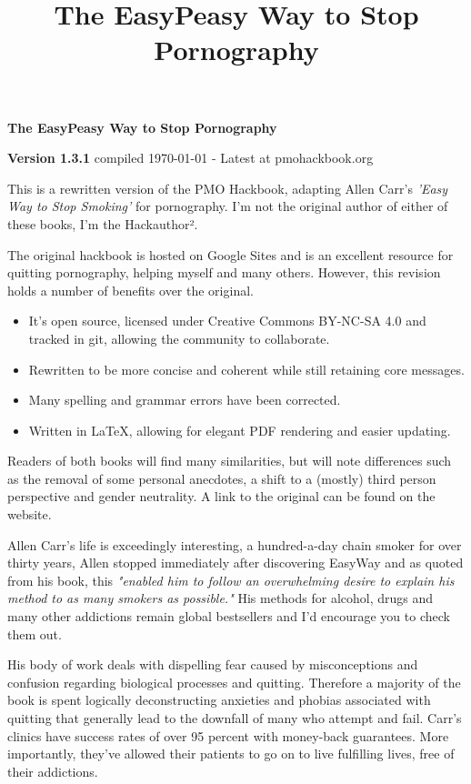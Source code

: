 \documentclass[easypeasy.tex]{subfiles}
\title {The EasyPeasy Way to Stop Pornography}
\begin{document}
\thispagestyle{empty}

\begin{center}
  {\Huge\bfseries The EasyPeasy Way to Stop Pornography \par}
  {\small \textbf{Version 1.3.1} compiled {\today} - Latest at pmohackbook.org}
\end{center}

This is a rewritten version of the PMO Hackbook, adapting Allen Carr's \textit{'Easy Way to Stop Smoking'} for pornography. I'm not the original author of either of these books, I'm the Hackauthor².

The original hackbook is hosted on Google Sites and is an excellent resource for quitting pornography, helping myself and many others. However, this revision holds a number of benefits over the original.
\begin{itemize}
\item It's open source, licensed under Creative Commons BY-NC-SA 4.0 and tracked in git, allowing the community to collaborate.
\item Rewritten to be more concise and coherent while still retaining core messages.
\item Many spelling and grammar errors have been corrected.
\item Written in LaTeX, allowing for elegant PDF rendering and easier updating.
\end{itemize}

Readers of both books will find many similarities, but will note differences such as the removal of some personal anecdotes, a shift to a (mostly) third person perspective and gender neutrality. A link to the original can be found on the website.

Allen Carr's life is exceedingly interesting, a hundred-a-day chain smoker for over thirty years, Allen stopped immediately after discovering EasyWay and as quoted from his book, this \textit{"enabled him to follow an overwhelming desire to explain his method to as many smokers as possible."} His methods for alcohol, drugs and many other addictions remain global bestsellers and I'd encourage you to check them out.

His body of work deals with dispelling fear caused by misconceptions and confusion regarding biological processes and quitting. Therefore a majority of the book is spent logically deconstructing anxieties and phobias associated with quitting that generally lead to the downfall of many who attempt and fail. Carr's clinics have success rates of over 95 percent with money-back guarantees. More importantly, they've allowed their patients to go on to live fulfilling lives, free of their addictions.
\end{document}
